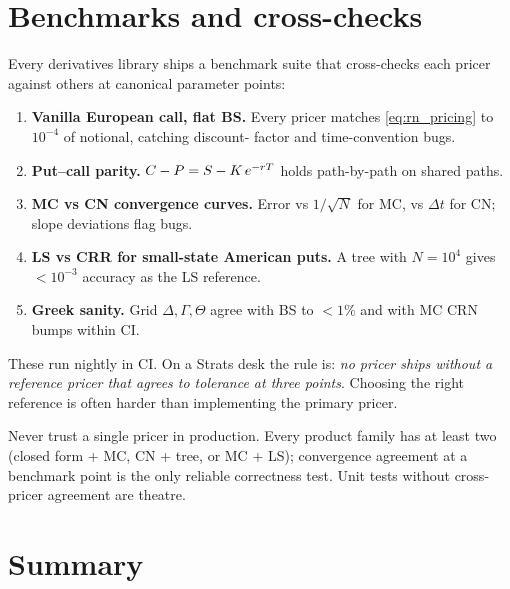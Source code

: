 \section{Benchmarks and cross-checks}
\label{sec:benchmarks}

Every derivatives library ships a benchmark suite that cross-checks
each pricer against others at canonical parameter points:

\begin{enumerate}
  \item \textbf{Vanilla European call, flat BS.}  Every pricer matches
    \eqref{eq:rn_pricing} to $10^{-4}$ of notional, catching discount-
    factor and time-convention bugs.
  \item \textbf{Put--call parity.}  $C - P = S - K\,
    e^{-rT}$ holds path-by-path on shared paths.
  \item \textbf{MC vs CN convergence curves.}  Error vs $1/\sqrt N$
    for MC, vs $\Delta t$ for CN; slope deviations flag bugs.
  \item \textbf{LS vs CRR for small-state American puts.}  A tree
    with $N=10^4$ gives $<10^{-3}$ accuracy as the LS reference.
  \item \textbf{Greek sanity.}  Grid $\Delta, \Gamma, \Theta$ agree
    with BS to $<1\%$ and with MC CRN bumps within CI.
\end{enumerate}

These run nightly in CI.  On a Strats desk the rule is: \emph{no
pricer ships without a reference pricer that agrees to tolerance at
three points}.  Choosing the right reference is often harder than
implementing the primary pricer.

\begin{keyfactbox}
Never trust a single pricer in production.  Every product family has
at least two (closed form + MC, CN + tree, or MC + LS); convergence
agreement at a benchmark point is the only reliable correctness test.
Unit tests without cross-pricer agreement are theatre.
\end{keyfactbox}


\section{Summary}
\label{sec:num_summary}

